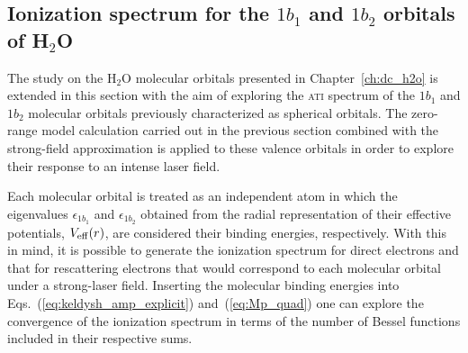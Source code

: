 \subsection{\label{sec:mo_sfa} Ionization spectrum for the $1b_{1}$ and $1b_{2}$ orbitals
  of H$_{2}$O}



The study on the H$_{2}$O molecular orbitals presented in
Chapter~\ref{ch:dc_h2o} is extended in this section with the aim of
exploring the \textsc{ati} spectrum of the $1b_{1}$ and $1b_{2}$
molecular orbitals previously characterized as spherical orbitals. The
zero-range model calculation carried out in the previous section
combined with the strong-field approximation is applied to these
valence orbitals in order to explore their response to an intense
laser field.


Each molecular orbital is treated as an independent atom in which the
eigenvalues $\epsilon_{1b_{1}}$ and $\epsilon_{1b_{2}}$ obtained from
the radial representation of their effective potentials,
$V_{\rm{eff}}(r)$, are considered their binding energies,
respectively. With this in mind, it is possible to generate the
ionization spectrum for direct electrons and that for rescattering
electrons that would correspond to each molecular orbital under a
strong-laser field. Inserting the molecular binding energies into
Eqs.~(\ref{eq:keldysh_amp_explicit}) and~(\ref{eq:Mp_quad}) one can
explore the convergence of the ionization spectrum in terms of the
number of Bessel functions included in their respective sums.

